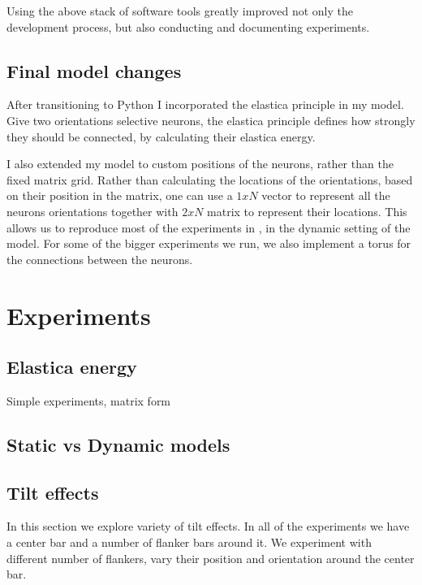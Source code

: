 Using the above stack of software tools greatly improved not only the development process, but also conducting and documenting experiments.

\section{Final model changes}
After transitioning to Python I incorporated the elastica principle in my model. Give two orientations selective neurons, the elastica principle defines how strongly they should be connected, by calculating their elastica energy.

I also extended my model to custom positions of the neurons, rather than the fixed matrix grid. Rather than calculating the locations of the orientations, based on their position in the matrix, one can use a $1xN$ vector to represent all the neurons orientations together with $2xN$ matrix to represent their locations. This allows us to reproduce most of the experiments in \cite{keemink2015unified}, in the dynamic setting of the model. For some of the bigger experiments we run, we also implement a torus for the connections between the neurons.


\chapter{Experiments}


\section{Elastica energy}

Simple experiments, matrix form


\section{Static vs Dynamic models}
\section{Tilt effects}

In this section we explore variety of tilt effects. In all of the experiments we have a center bar and a number of flanker bars around it. We experiment with different number of flankers, vary their position and orientation around the center bar.

